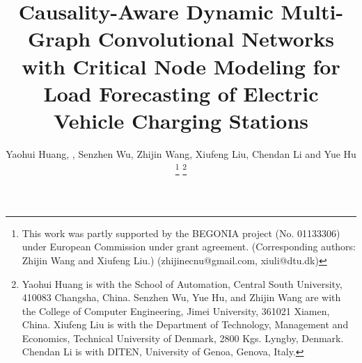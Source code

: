 \documentclass[lettersize,journal]{IEEEtran}
\begin{document}
\title{Causality-Aware Dynamic Multi-Graph Convolutional Networks with Critical Node Modeling for Load Forecasting of Electric Vehicle Charging Stations}

\author{Yaohui Huang, , Senzhen Wu, Zhijin Wang, Xiufeng Liu, Chendan Li and Yue Hu\vspace{-28pt}
	\thanks{This work was partly supported by the BEGONIA project (No. 01133306) under European Commission under grant agreement. (Corresponding authors: Zhijin Wang and Xiufeng Liu.) (zhijinecnu@gmail.com, xiuli@dtu.dk)}
	\thanks{Yaohui Huang is with the School of Automation, Central South University, 410083 Changsha, China. Senzhen Wu, Yue Hu, and Zhijin Wang are with the College of Computer Engineering, Jimei University, 361021 Xiamen, China. Xiufeng Liu is with the Department of Technology, Management and Economics, Technical University of Denmark, 2800 Kgs. Lyngby, Denmark. Chendan Li is with DITEN, University of Genoa, Genova, Italy.}
	}


\end{document}
